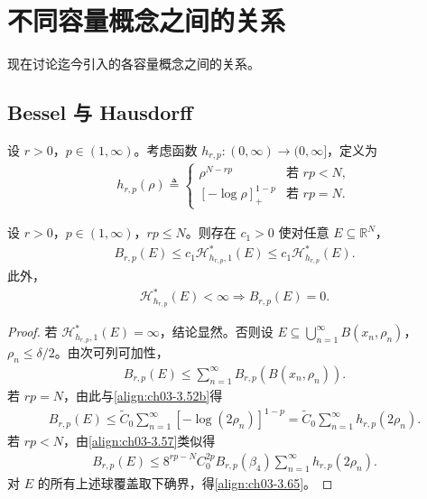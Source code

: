 \documentclass[../../main.tex]{subfiles}%
\begin{document}
\section{不同容量概念之间的关系}\label{section:ch03-容量关系}

现在讨论迄今引入的各容量概念之间的关系。

\subsection{Bessel 与 Hausdorff}\label{subsection:ch03-BesselHausdorff}

设 $r>0$，$p\in(1,\infty)$。考虑函数 $h_{r,p}:(0,\infty)\to(0,\infty]$，定义为
\begin{align}
h_{r,p}(\rho)\triangleq \begin{cases}
\rho^{N-rp} & \text{若 }rp<N,\\
[-\log\rho]_+^{1-p} & \text{若 }rp=N.
\end{cases}\label{align:ch03-3.64}
\end{align}

\begin{proposition}\label{proposition:ch03-BesselHausdorff上界}
设 $r>0$，$p\in(1,\infty)$，$rp\leqslant N$。则存在 $c_1>0$ 使对任意 $E\subseteq\mathbb{R}^N$，
\begin{align}
B_{r,p}(E)\leqslant c_1\mathcal{H}^*_{h_{r,p},1}(E)\leqslant c_1\mathcal{H}^*_{h_{r,p}}(E).\label{align:ch03-3.65}
\end{align}
此外，
\begin{align}
\mathcal{H}^*_{h_{r,p}}(E)<\infty\Rightarrow B_{r,p}(E)=0.\label{align:ch03-3.66}
\end{align}
\end{proposition}

\begin{proof}
若 $\mathcal{H}^*_{h_{r,p},1}(E)=\infty$，结论显然。否则设 $E\subseteq\bigcup_{n=1}^\infty B(x_n,\rho_n)$，$\rho_n\leqslant\delta/2$。由次可列可加性，
\begin{align*}
B_{r,p}(E)\leqslant\sum_{n=1}^\infty B_{r,p}(B(x_n,\rho_n)).
\end{align*}
若 $rp=N$，由此与\eqref{align:ch03-3.52b}得
\begin{align*}
B_{r,p}(E)\leqslant\widetilde C_0\sum_{n=1}^\infty[-\log(2\rho_n)]^{1-p}
=\widetilde C_0\sum_{n=1}^\infty h_{r,p}(2\rho_n).
\end{align*}
若 $rp<N$，由\eqref{align:ch03-3.57}类似得
\begin{align*}
B_{r,p}(E)\leqslant 8^{rp-N}C_0^{2p}B_{r,p}(\beta_4)\sum_{n=1}^\infty h_{r,p}(2\rho_n).
\end{align*}
对 $E$ 的所有上述球覆盖取下确界，得\eqref{align:ch03-3.65}。
\end{proof}
\end{document}
